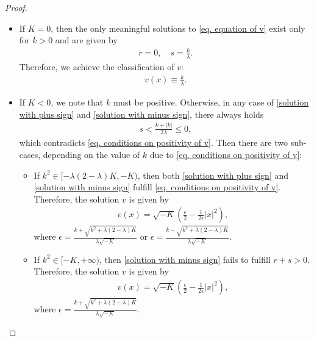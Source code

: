 \documentclass[11pt,a4paper,twoside]{amsart}
\newtheorem{sketch proof}{Sketch of the proof}[section]
\begin{document}
\begin{proof}
\begin{itemize}
\item  If $K=0$, then the only meaningful solutions to \cref{eq. equation of v} exist only for $k>0$ and are given by
\begin{align*}
    r=0,\quad s=\frac{k}{\lambda}.
\end{align*}
Therefore, we achieve the classification of $v$:
\begin{align*}
    v(x)\equiv \frac{k}{\lambda}.
\end{align*}
\item 
If $K<0$, we note that $k$ must be positive. Otherwise, in any case of \cref{solution with plus sign} and \cref{solution with minus sign}, there always holds
\begin{align*}
    s<\frac{k+|k|}{2\lambda}\leq 0,
\end{align*}
which contradicts \cref{eq. conditions on positivity of v}. Then there are two sub-cases, depending on the value of $k$ due to \cref{eq. conditions on positivity of v}:
\begin{itemize}
    \item  If $k^2\in[-\lambda(2-\lambda)K,-K)$, then both \cref{solution with plus sign} and \cref{solution with minus sign} fulfill \cref{eq. conditions on positivity of v}. Therefore, the solution $v$ is given by
    \begin{align*}
        v(x)=\sqrt{-K}
        \left(\frac{\epsilon}{2}-\frac{1}{2\epsilon}|x|^2\right),
    \end{align*}
    where $\epsilon=
    \frac{k+\sqrt{k^2+\lambda(2-\lambda)K}}
    {\lambda\sqrt{-K}}$ or $\epsilon=
    \frac{k-\sqrt{k^2+\lambda(2-\lambda)K}}
    {\lambda\sqrt{-K}}$.
    \item If $k^2\in[-K,+\infty)$, then \cref{solution with minus sign} fails to fulfill $r+s>0$. Therefore, the solution $v$ is given by
    \begin{align*}
       v(x)=\sqrt{-K}
        \left(\frac{\epsilon}{2}-\frac{1}{2\epsilon}|x|^2\right),
    \end{align*}
    where $\epsilon=
    \frac{k+\sqrt{k^2+\lambda(2-\lambda)K}}
    {\lambda\sqrt{-K}}$.
\end{itemize}
\end{itemize}



\end{proof}
\end{document}
